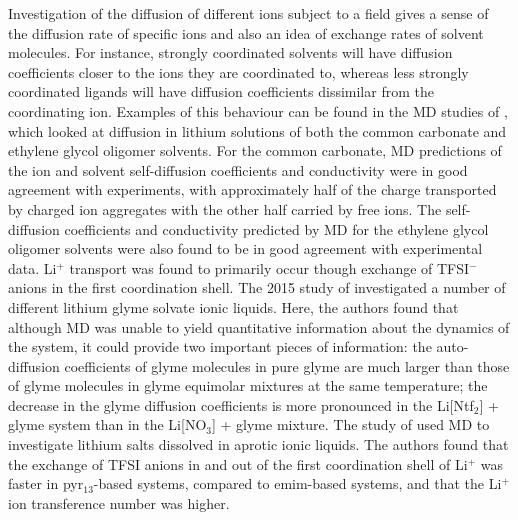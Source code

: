 \documentclass[../main.tex]{subfiles}
\begin{document}
Investigation of the diffusion of different ions subject to a field gives a sense of the diffusion rate of specific ions and also an idea of exchange rates of solvent molecules.  For instance, strongly coordinated solvents will have diffusion coefficients closer to the ions they are coordinated to, whereas less strongly coordinated ligands will have diffusion coefficients dissimilar from the coordinating ion.\cite{shimizu_structural_2015, lesch_influence_2015, borodin_litfsi_2006,borodin_li_2006,borodin_li_2007} Examples of this behaviour can be found in the MD studies of \citeauthor{borodin_li_2006}, which looked at diffusion in lithium solutions of both the common carbonate\cite{borodin_litfsi_2006} and ethylene glycol oligomer solvents.\cite{borodin_li_2006} For the common carbonate, MD predictions of the ion and solvent self-diffusion coefficients and conductivity were in good agreement with experiments, with approximately half of the charge transported by charged ion aggregates with the other half carried by free ions.\cite{borodin_litfsi_2006} The self-diffusion coefficients and conductivity predicted by MD for the ethylene glycol oligomer solvents were also found to be in good agreement with experimental data. Li$^+$ transport was found to primarily occur though exchange of TFSI$^-$ anions in the first coordination shell.\cite{borodin_li_2006} The 2015 study of \citeauthor{shimizu_structural_2015} investigated a number of different lithium glyme solvate ionic liquids.\cite{shimizu_structural_2015} Here, the authors found that although MD was unable to yield quantitative information about the dynamics of the system, it could provide two important pieces of information: the auto-diffusion coefficients of glyme molecules in pure glyme are much larger than those of glyme molecules in glyme equimolar mixtures at the same temperature; the decrease in the glyme diffusion coefficients is more pronounced in the Li[Ntf$_2$] + glyme system than in the Li[NO$_3$] + glyme mixture.\cite{shimizu_structural_2015} The study of \citeauthor{lesch_influence_2015} used MD to investigate lithium salts dissolved in aprotic ionic liquids.\cite{lesch_influence_2015} The authors found that the exchange of TFSI anions in and out of the first coordination shell of Li$^+$ was faster in pyr$_{13}$-based systems, compared to emim-based systems, and that the Li$^+$ ion transference number was higher. \cite{lesch_influence_2015} \cite{shimizu_structural_2015}
\end{document}
